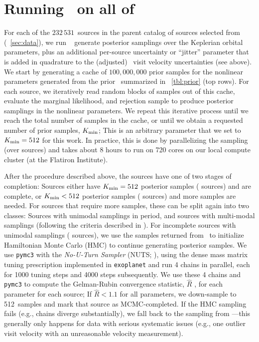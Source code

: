 \documentclass[modern]{aastex63}
\newcommand{\nsources}{\ensuremath{232\,531}}
\newcommand{\Kmin}{K_{\rm min}}
\newcommand{\Kminval}{512}
\begin{document}
\section{Running \thejoker\ on all of \apogee\ } \label{sec:rundr16}

For each of the \nsources\ sources in the parent catalog of sources selected
from \apogee\  (\sectionname~\ref{sec:data}), we run \thejoker\
\citep{thejoker} generate posterior samplings over the Keplerian orbital
parameters, plus an additional per-source uncertainty or ``jitter'' parameter
that is added in quadrature to the (adjusted) \apogee\ visit velocity
uncertainties (see above).
We start by generating a cache of $100,000,000$ prior samples for the nonlinear
parameters generated from the prior \pdf\ summarized in
\tablename~\ref{tbl:prior} (top rows).
For each source, we iteratively read random blocks of samples out of this cache,
evaluate the marginal likelihood, and rejection sample to produce posterior
samplings in the nonlinear parameters.
We repeat this iterative process until we reach the total number of samples in
the cache, or until we obtain a requested number of prior samples, $\Kmin$; This
is an arbitrary parameter that we set to $\Kmin = \Kminval$ for this work.
In practice, this is done by parallelizing the sampling (over sources) and takes
about 8 hours to run on 720 cores on our local compute cluster (at the Flatiron
Institute).

After the procedure described above, the sources have one of two stages of
completion: Sources either have $\Kmin = \Kminval$ posterior samples (
sources) and are complete, or $\Kmin < \Kminval$ posterior samples (\todo{XX}
sources) and more samples are needed.
For sources that require more samples, these can be split again into two
classes: Sources with unimodal samplings in period, and sources with multi-modal
samplings (following the criteria described in \citealt{thejoker}).
For incomplete sources with unimodal samplings (\todo{XX} sources), we use the
samples returned from \thejoker\ to initialize Hamiltonian Monte Carlo (HMC) to
continue generating posterior samples.
We use \texttt{pymc3} with the \emph{No-U-Turn Sampler} (NUTS; \citealt{NUTS}),
using the dense mass matrix tuning prescription implemented in
\texttt{exoplanet} \citep{exoplanet:exoplanet} and run 4 chains in parallel,
each for 1000 tuning steps and 4000 steps subsequently.
We use these 4 chains and \texttt{pymc3} to compute the Gelman-Rubin convergence
statistic, $\hat{R}$ \citep{Gelman:1992}, for each parameter for each source; If
$\hat{R} < 1.1$ for all parameters, we down-sample to \Kminval\ samples and mark
that source as MCMC-completed.
If the HMC sampling fails (e.g., chains diverge substantially), we fall back to
the sampling from \thejoker---this generally only happens for data with serious
systematic issues (e.g., one outlier visit velocity with an unreasonable
velocity measurement).
\end{document}
